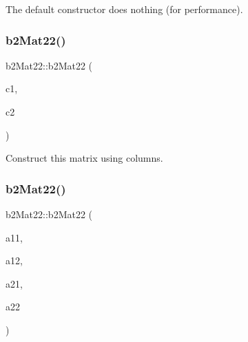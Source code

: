 The default constructor does nothing (for performance). 

\mbox{\label{structb2_mat22_abd674c6d92e26962977f34bcd92ff24d}} 
\subsubsection{\texorpdfstring{b2Mat22()}{b2Mat22()}\hspace{0.1cm}{\footnotesize\ttfamily [2/3]}}
{\footnotesize\ttfamily b2\+Mat22\+::b2\+Mat22 (\begin{DoxyParamCaption}\item[{const \mbox{\hyperlink{structb2_vec2}{b2\+Vec2}} \&}]{c1,  }\item[{const \mbox{\hyperlink{structb2_vec2}{b2\+Vec2}} \&}]{c2 }\end{DoxyParamCaption})\hspace{0.3cm}{\ttfamily [inline]}}



Construct this matrix using columns. 

\mbox{\label{structb2_mat22_a41d5d8743bda32cb8c6e212528934810}} 
\subsubsection{\texorpdfstring{b2Mat22()}{b2Mat22()}\hspace{0.1cm}{\footnotesize\ttfamily [3/3]}}
{\footnotesize\ttfamily b2\+Mat22\+::b2\+Mat22 (\begin{DoxyParamCaption}\item[{\mbox{\hyperlink{b2_settings_8h_aacdc525d6f7bddb3ae95d5c311bd06a1}{float32}}}]{a11,  }\item[{\mbox{\hyperlink{b2_settings_8h_aacdc525d6f7bddb3ae95d5c311bd06a1}{float32}}}]{a12,  }\item[{\mbox{\hyperlink{b2_settings_8h_aacdc525d6f7bddb3ae95d5c311bd06a1}{float32}}}]{a21,  }\item[{\mbox{\hyperlink{b2_settings_8h_aacdc525d6f7bddb3ae95d5c311bd06a1}{float32}}}]{a22 }\end{DoxyParamCaption})\hspace{0.3cm}{\ttfamily [inline]}}



